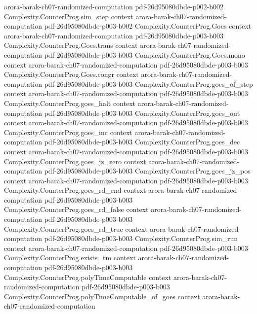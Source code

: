 \begin{theorem}
  {arora-barak-ch07-randomized-computation}
  {pdf-26d95080dbde-p002-b002}
\proofstep
  {Complexity.CounterProg.sim_step}
  {context}
  {arora-barak-ch07-randomized-computation}
  {pdf-26d95080dbde-p003-b002}
\proofstep
  {Complexity.CounterProg.Goes}
  {context}
  {arora-barak-ch07-randomized-computation}
  {pdf-26d95080dbde-p003-b003}
\proofstep
  {Complexity.CounterProg.Goes.trans}
  {context}
  {arora-barak-ch07-randomized-computation}
  {pdf-26d95080dbde-p003-b003}
\proofstep
  {Complexity.CounterProg.Goes.mono}
  {context}
  {arora-barak-ch07-randomized-computation}
  {pdf-26d95080dbde-p003-b003}
\proofstep
  {Complexity.CounterProg.Goes.congr}
  {context}
  {arora-barak-ch07-randomized-computation}
  {pdf-26d95080dbde-p003-b003}
\proofstep
  {Complexity.CounterProg.goes_of_step}
  {context}
  {arora-barak-ch07-randomized-computation}
  {pdf-26d95080dbde-p003-b003}
\proofstep
  {Complexity.CounterProg.goes_halt}
  {context}
  {arora-barak-ch07-randomized-computation}
  {pdf-26d95080dbde-p003-b003}
\proofstep
  {Complexity.CounterProg.goes_out}
  {context}
  {arora-barak-ch07-randomized-computation}
  {pdf-26d95080dbde-p003-b003}
\proofstep
  {Complexity.CounterProg.goes_inc}
  {context}
  {arora-barak-ch07-randomized-computation}
  {pdf-26d95080dbde-p003-b003}
\proofstep
  {Complexity.CounterProg.goes_dec}
  {context}
  {arora-barak-ch07-randomized-computation}
  {pdf-26d95080dbde-p003-b003}
\proofstep
  {Complexity.CounterProg.goes_jz_zero}
  {context}
  {arora-barak-ch07-randomized-computation}
  {pdf-26d95080dbde-p003-b003}
\proofstep
  {Complexity.CounterProg.goes_jz_pos}
  {context}
  {arora-barak-ch07-randomized-computation}
  {pdf-26d95080dbde-p003-b003}
\proofstep
  {Complexity.CounterProg.goes_rd_end}
  {context}
  {arora-barak-ch07-randomized-computation}
  {pdf-26d95080dbde-p003-b003}
\proofstep
  {Complexity.CounterProg.goes_rd_false}
  {context}
  {arora-barak-ch07-randomized-computation}
  {pdf-26d95080dbde-p003-b003}
\proofstep
  {Complexity.CounterProg.goes_rd_true}
  {context}
  {arora-barak-ch07-randomized-computation}
  {pdf-26d95080dbde-p003-b003}
\proofstep
  {Complexity.CounterProg.sim_run}
  {context}
  {arora-barak-ch07-randomized-computation}
  {pdf-26d95080dbde-p003-b003}
\proofstep
  {Complexity.CounterProg.exists_tm}
  {context}
  {arora-barak-ch07-randomized-computation}
  {pdf-26d95080dbde-p003-b003}
\proofstep
  {Complexity.CounterProg.polyTimeComputable}
  {context}
  {arora-barak-ch07-randomized-computation}
  {pdf-26d95080dbde-p003-b003}
\proofstep
  {Complexity.CounterProg.polyTimeComputable_of_goes}
  {context}
  {arora-barak-ch07-randomized-computation}

\end{theorem}
